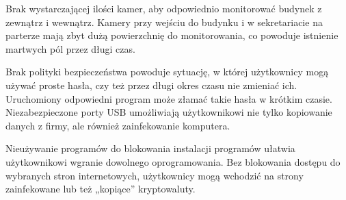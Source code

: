 Brak wystarczającej ilości kamer, aby odpowiednio monitorować budynek z zewnątrz i wewnątrz. Kamery przy wejściu do budynku i w sekretariacie na parterze mają zbyt dużą powierzchnię do monitorowania, co powoduje istnienie martwych pól przez długi czas.  

Brak polityki bezpieczeństwa powoduje sytuację, w której użytkownicy mogą używać proste hasła, czy też przez długi okres czasu nie zmieniać ich. Uruchomiony odpowiedni program może złamać takie hasła w krótkim czasie. 
Niezabezpieczone porty USB umożliwiają użytkownikowi nie tylko kopiowanie danych z firmy, ale również zainfekowanie komputera.  

Nieużywanie programów do blokowania instalacji programów ułatwia użytkownikowi wgranie dowolnego oprogramowania. Bez blokowania  dostępu do wybranych stron internetowych, użytkownicy mogą wchodzić na strony zainfekowane lub też „kopiące” kryptowaluty.

